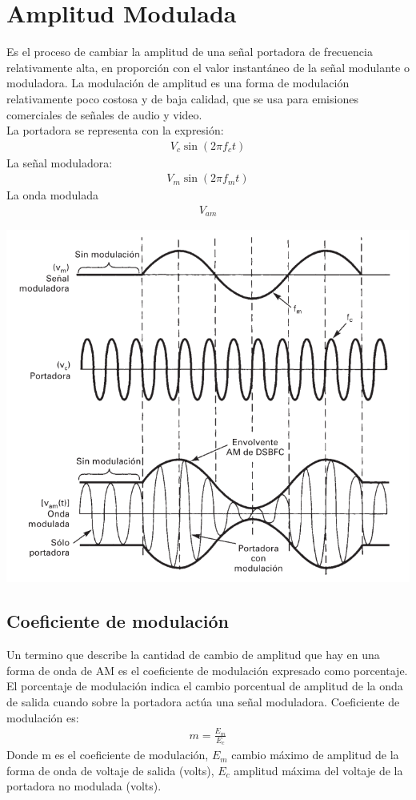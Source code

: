 \documentclass[10pt,a4paper]{article}
\begin{document}
\section{Amplitud Modulada}
Es el proceso de cambiar la amplitud de una señal portadora de frecuencia relativamente alta, en proporción con el valor instantáneo de la señal modulante o moduladora. La modulación de amplitud es una forma de modulación relativamente poco costosa y de baja calidad, que se usa para emisiones comerciales de señales de audio y video.
\\
La portadora se representa con la expresión:
\begin{align}
	V_c\sin(2\pi f_c t)
\end{align}
La señal moduladora:
\begin{align}
	V_m\sin (2\pi f_m t)
\end{align}
La onda modulada
\begin{align}
	V_{am}
\end{align}
\begin{center}
	\includegraphics[scale=0.5]{screenshot001}
\end{center}
\subsection{Coeficiente de modulación}
Un termino que describe la cantidad de cambio de amplitud que hay en una forma de onda de AM es el coeficiente de modulación expresado como porcentaje. El porcentaje de modulación indica el cambio porcentual de amplitud de la onda de salida cuando sobre la portadora actúa una señal moduladora. Coeficiente de modulación es:
\begin{align}
	m=\frac{E_m}{E_c}
\end{align}
Donde m es el coeficiente de modulación, $E_m$ cambio máximo de amplitud de la forma de onda de voltaje de salida (volts), $E_c$ amplitud máxima del voltaje de la portadora no modulada (volts).
\end{document}
